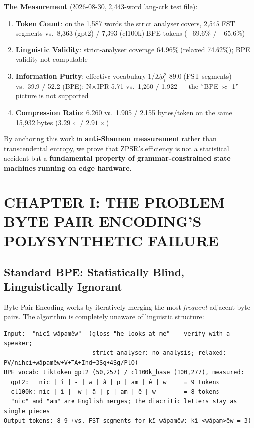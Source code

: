 \documentclass[11pt,oneside]{article}
\begin{document}
\textbf{The Measurement} (2026-08-30, 2,443-word lang-crk test file):
\begin{enumerate}
  \item \textbf{Token Count}: on the 1,587 words the strict analyser covers, 2,545 FST segments vs.\ 8,363 (gpt2) / 7,393 (cl100k) BPE tokens ($-69.6\%$ / $-65.6\%$)
  \item \textbf{Linguistic Validity}: strict-analyser coverage 64.96\% (relaxed 74.62\%); BPE validity not computable
  \item \textbf{Information Purity}: effective vocabulary $1/\Sigma p_i^2$ 89.0 (FST segments) vs.\ 39.9 / 52.2 (BPE); N×IPR 5.71 vs.\ 1,260 / 1,922 --- the ``BPE $\approx$ 1'' picture is not supported
  \item \textbf{Compression Ratio}: 6.260 vs.\ 1.905 / 2.155 bytes/token on the same 15,932 bytes ($3.29\times$ / $2.91\times$)
\end{enumerate}

By anchoring this work in \textbf{anti-Shannon measurement} rather than transcendental entropy, we prove that ZPSR's efficiency is not a statistical accident but a \textbf{fundamental property of grammar-constrained state machines running on edge hardware}.

\section{CHAPTER I: THE PROBLEM --- BYTE PAIR ENCODING'S POLYSYNTHETIC FAILURE}

\subsection{Standard BPE: Statistically Blind, Linguistically Ignorant}

Byte Pair Encoding works by iteratively merging the most \emph{frequent} adjacent byte pairs. The algorithm is completely unaware of linguistic structure:

\begin{lstlisting}
Input:  "nicî-wâpamêw"  (gloss "he looks at me" -- verify with a speaker;
                         strict analyser: no analysis; relaxed: PV/nihci+wâpamêw+V+TA+Ind+3Sg+4Sg/PlO)
BPE vocab: tiktoken gpt2 (50,257) / cl100k_base (100,277), measured:
  gpt2:   nic | î | - | w | â | p | am | ê | w     = 9 tokens
  cl100k: nic | î | -w | â | p | am | ê | w        = 8 tokens
  "nic" and "am" are English merges; the diacritic letters stay as single pieces
Output tokens: 8-9 (vs. FST segments for kî-wâpamêw: kî-<wâpam>êw = 3)
\end{lstlisting}
\end{document}
